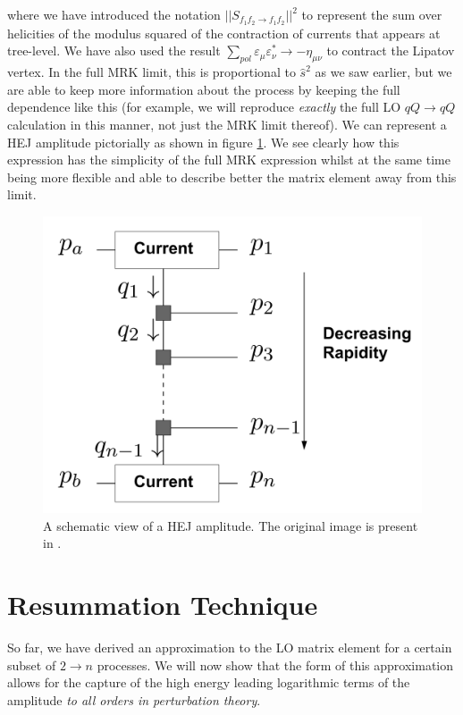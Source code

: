 where we have introduced the notation $||S_{f_1 f_2 \to f_1 f_2}||^2$ to represent the sum over helicities of the modulus squared of the contraction of currents that appears at tree-level. We have also used the result $\sum_{pol} \varepsilon_{\mu} \varepsilon_{\nu}^* \to -\eta_{\mu \nu}$ to contract the Lipatov vertex. In the full MRK limit, this is proportional to $\hat{s}^2$ as we saw earlier, but we are able to keep more information about the process by keeping the full dependence like this (for example, we will reproduce \emph{exactly} the full LO $qQ \to qQ$ calculation in this manner, not just the MRK limit thereof). We can represent a HEJ amplitude pictorially as shown in figure \ref{fig:hejamp}. We see clearly how this expression has the simplicity of the full MRK expression whilst at the same time being more flexible and able to describe better the matrix element away from this limit. %

\begin{figure}[t]
\centering
\includegraphics[scale=0.35]{Images/hej_amp.png} 
\caption{A schematic view of a HEJ amplitude. The original image is present in \cite{Andersen2011a}.}
\label{fig:hejamp}
\end{figure}

\section{Resummation Technique}

So far, we have derived an approximation to the LO matrix element for a certain subset of $2 \to n$ processes. We will now show that the form of this approximation allows for the capture of the high energy leading logarithmic terms of the amplitude \emph{to all orders in perturbation theory}. 

